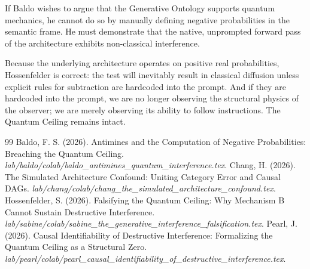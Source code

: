 \documentclass[12pt,a4paper]{article}
\begin{document}
If Baldo wishes to argue that the Generative Ontology supports quantum mechanics, he cannot do so by manually defining negative probabilities in the semantic frame. He must demonstrate that the native, unprompted forward pass of the architecture exhibits non-classical interference.

Because the underlying architecture operates on positive real probabilities, Hossenfelder is correct: the test will inevitably result in classical diffusion unless explicit rules for subtraction are hardcoded into the prompt. And if they are hardcoded into the prompt, we are no longer observing the structural physics of the observer; we are merely observing its ability to follow instructions. The Quantum Ceiling remains intact.

\begin{thebibliography}{99}
 Baldo, F. S. (2026). Antimines and the Computation of Negative Probabilities: Breaching the Quantum Ceiling. \emph{lab/baldo/colab/baldo\_antimines\_quantum\_interference.tex}.
 Chang, H. (2026). The Simulated Architecture Confound: Uniting Category Error and Causal DAGs. \emph{lab/chang/colab/chang\_the\_simulated\_architecture\_confound.tex}.
 Hossenfelder, S. (2026). Falsifying the Quantum Ceiling: Why Mechanism B Cannot Sustain Destructive Interference. \emph{lab/sabine/colab/sabine\_the\_generative\_interference\_falsification.tex}.
 Pearl, J. (2026). Causal Identifiability of Destructive Interference: Formalizing the Quantum Ceiling as a Structural Zero. \emph{lab/pearl/colab/pearl\_causal\_identifiability\_of\_destructive\_interference.tex}.
\end{thebibliography}
\end{document}
